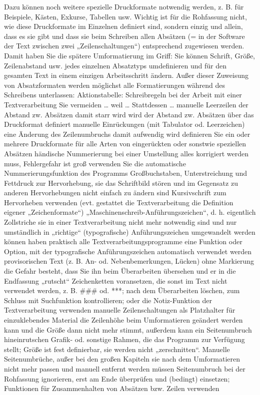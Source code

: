 \documentclass[]{book}
\theoremstyle{definition}
\theoremstyle{definition}
\theoremstyle{definition}
\theoremstyle{remark}
\begin{document}
Dazu können noch weitere spezielle Druckformate notwendig werden, z. B.
für Beispiele, Kästen, Exkurse, Tabellen usw. Wichtig ist für die
Rohfassung nicht, wie diese Druckformate im Einzelnen definiert sind,
sondern einzig und allein, dass es sie gibt und dass sie beim Schreiben
allen Absätzen (= in der Software der Text zwischen zwei
„Zeilenschaltungen``) entsprechend zugewiesen werden. Damit haben Sie
die spätere Umformatierung im Griff: Sie können Schrift, Größe,
Zeilenabstand usw. jedes einzelnen Absatztyps umdefinieren und für den
gesamten Text in einem einzigen Arbeitsschritt ändern. Außer dieser
Zuweisung von Absatzformaten werden möglichst alle Formatierungen
während des Schreibens unterlassen: Aktionstabelle: Schreibregeln bei
der Arbeit mit einer Textverarbeitung Sie vermeiden \ldots{} weil
\ldots{} Stattdessen \ldots{} manuelle Leerzeilen der Abstand zw.
Absätzen damit starr wird wird der Abstand zw. Absätzen über das
Druckformat definiert manuelle Einrückungen (mit Tabulator od.
Leerzeichen) eine Änderung des Zeilenumbruchs damit aufwendig wird
definieren Sie ein oder mehrere Druckformate für alle Arten von
eingerückten oder sonstwie speziellen Absätzen händische Nummerierung
bei einer Umstellung alles korrigiert werden muss, Fehlergefahr ist groß
verwenden Sie die automatische Nummerierungsfunktion des Programms
Großbuchstaben, Unterstreichung und Fettdruck zur Hervorhebung, sie das
Schriftbild stören und im Gegensatz zu anderen Hervorhebungen nicht
einfach zu ändern sind Kursivschrift zum Hervorheben verwenden (evt.
gestattet die Textverarbeitung die Definition eigener „Zeichenformate``)
„Maschinenschreib-Anführungszeichen``, d. h. eigentlich Zollstriche sie
in einer Textverarbeitung nicht mehr notwendig sind und nur umständlich
in „richtige`` (typografische) Anführungszeichen umgewandelt werden
können haben praktisch alle Textverarbeitungsprogramme eine Funktion
oder Option, mit der typografische Anführungszeichen automatisch
verwendet werden provisorischen Text (z. B. An- od. Nebenbemerkungen,
Lücken) ohne Markierung die Gefahr besteht, dass Sie ihn beim
Überarbeiten übersehen und er in die Endfassung „rutscht`` Zeichenketten
voransetzen, die sonst im Text nicht verwendet werden, z. B. \#\#\# od.
***; nach dem Überarbeiten löschen, zum Schluss mit Suchfunktion
kontrollieren; oder die Notiz-Funktion der Textverarbeitung verwenden
manuelle Zeilenschaltungen als Platzhalter für einzuklebendes Material
die Zeilenhöhe beim Umformatieren geändert werden kann und die Größe
dann nicht mehr stimmt, außerdem kann ein Seitenumbruch hineinrutschen
Grafik- od. sonstige Rahmen, die das Programm zur Verfügung stellt;
Größe ist fest definierbar, sie werden nicht „zerschnitten``. Manuelle
Seitenumbrüche, außer bei den großen Kapiteln sie nach dem Umformatieren
nicht mehr passen und manuell entfernt werden müssen Seitenumbruch bei
der Rohfassung ignorieren, erst am Ende überprüfen und (bedingt)
einsetzen; Funktionen für Zusammenhalten von Absätzen bzw. Zeilen
verwenden
\end{document}
